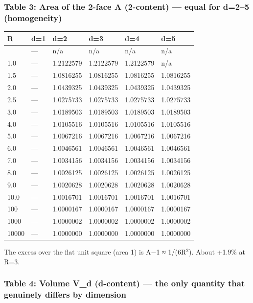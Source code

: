 \documentclass[
]{ltjsarticle}
\newcounter{none} %
\begin{document}
\subsubsection{Table 3: Area of the 2-face A (2-content) --- equal for
d=2--5
(homogeneity)}\label{table-3-area-of-the-2-face-a-2-content-equal-for-d25-homogeneity}

{\def\LTcaptype{none} %
\begin{longtable}[]{@{}llllll@{}}
\toprule\noalign{}
R & d=1 & d=2 & d=3 & d=4 & d=5 \\
\midrule\noalign{}
\endhead
\bottomrule\noalign{}
\endlastfoot
0.5 & --- & n/a & n/a & n/a & n/a \\
1.0 & --- & 1.2122579 & 1.2122579 & 1.2122579 & n/a \\
1.5 & --- & 1.0816255 & 1.0816255 & 1.0816255 & 1.0816255 \\
2.0 & --- & 1.0439325 & 1.0439325 & 1.0439325 & 1.0439325 \\
2.5 & --- & 1.0275733 & 1.0275733 & 1.0275733 & 1.0275733 \\
3.0 & --- & 1.0189503 & 1.0189503 & 1.0189503 & 1.0189503 \\
4.0 & --- & 1.0105516 & 1.0105516 & 1.0105516 & 1.0105516 \\
5.0 & --- & 1.0067216 & 1.0067216 & 1.0067216 & 1.0067216 \\
6.0 & --- & 1.0046561 & 1.0046561 & 1.0046561 & 1.0046561 \\
7.0 & --- & 1.0034156 & 1.0034156 & 1.0034156 & 1.0034156 \\
8.0 & --- & 1.0026125 & 1.0026125 & 1.0026125 & 1.0026125 \\
9.0 & --- & 1.0020628 & 1.0020628 & 1.0020628 & 1.0020628 \\
10.0 & --- & 1.0016701 & 1.0016701 & 1.0016701 & 1.0016701 \\
100 & --- & 1.0000167 & 1.0000167 & 1.0000167 & 1.0000167 \\
1000 & --- & 1.0000002 & 1.0000002 & 1.0000002 & 1.0000002 \\
10000 & --- & 1.0000000 & 1.0000000 & 1.0000000 & 1.0000000 \\
\end{longtable}
}

The excess over the flat unit square (area 1) is A−1 ≈ 1/(6R\(^{2}\)).
About +1.9\% at R=3.

\subsubsection{Table 4: Volume V\_d (d-content) --- the only quantity
that genuinely differs by
dimension}\label{table-4-volume-v_d-d-content-the-only-quantity-that-genuinely-differs-by-dimension}
\end{document}

